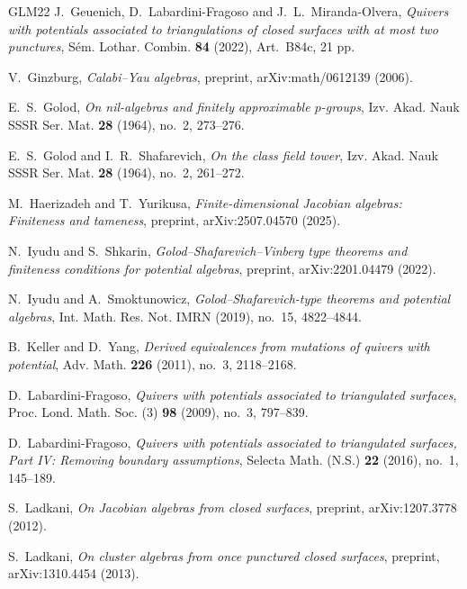 \documentclass[11pt,letterpaper,reqno]{amsart}
\theoremstyle{definition}
\begin{document}
\begin{thebibliography}{GLM22}
		J.~Geuenich, D.~Labardini-Fragoso and J.~L.~Miranda-Olvera,
		\emph{Quivers with potentials associated to triangulations of closed surfaces
			with at most two punctures},
		S\'em. Lothar. Combin. \textbf{84} (2022), Art.~B84c, 21 pp.
		
		V.~Ginzburg,
		\emph{Calabi--Yau algebras},
		preprint, arXiv:math/0612139 (2006).
		
		E.~S.~Golod,
		\emph{On nil-algebras and finitely approximable $p$-groups},
		Izv. Akad. Nauk SSSR Ser. Mat. \textbf{28} (1964), no.~2, 273--276.
		
		E.~S.~Golod and I.~R.~Shafarevich,
		\emph{On the class field tower},
		Izv. Akad. Nauk SSSR Ser. Mat. \textbf{28} (1964), no.~2, 261--272.
		
		M.~Haerizadeh and T.~Yurikusa,
		\emph{Finite-dimensional Jacobian algebras: Finiteness and tameness},
		preprint, arXiv:2507.04570 (2025).
		
		N.~Iyudu and S.~Shkarin,
		\emph{Golod--Shafarevich--Vinberg type theorems and finiteness conditions
			for potential algebras},
		preprint, arXiv:2201.04479 (2022).
		
		N.~Iyudu and A.~Smoktunowicz,
		\emph{Golod--Shafarevich-type theorems and potential algebras},
		Int. Math. Res. Not. IMRN (2019), no.~15, 4822--4844.
		
		B.~Keller and D.~Yang,
		\emph{Derived equivalences from mutations of quivers with potential},
		Adv. Math. \textbf{226} (2011), no.~3, 2118--2168.
		
		D.~Labardini-Fragoso,
		\emph{Quivers with potentials associated to triangulated surfaces},
		Proc. Lond. Math. Soc. (3) \textbf{98} (2009), no.~3, 797--839.
		
		D.~Labardini-Fragoso,
		\emph{Quivers with potentials associated to triangulated surfaces, Part IV:
			Removing boundary assumptions},
		Selecta Math. (N.S.) \textbf{22} (2016), no.~1, 145--189.
		
		S.~Ladkani,
		\emph{On Jacobian algebras from closed surfaces},
		preprint, arXiv:1207.3778 (2012).
		
		S.~Ladkani,
		\emph{On cluster algebras from once punctured closed surfaces},
		preprint, arXiv:1310.4454 (2013).
		

\end{thebibliography}
\end{document}
